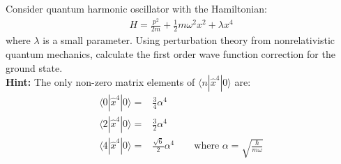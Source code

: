 \documentclass[11pt,a4paper]{article}
\begin{document}
Consider quantum harmonic oscillator with the Hamiltonian:
\begin{align*}
  H = \frac{p^2}{2m} + \frac{1}{2} m \omega^2 x^2 + \lambda x^4
\end{align*}
where $\lambda$ is a small parameter. 
Using perturbation theory from nonrelativistic quantum mechanics, calculate the first order wave function correction 
for the ground state. \\

{\bf Hint:} The only non-zero matrix elements of $\langle n|\hat{x}^4|0\rangle$ are:
\begin{align*}
   \langle 0 | \hat{x}^4 | 0 \rangle =& \frac{3}{4} \alpha^{4} \\
   \langle 2 | \hat{x}^4 | 0 \rangle =& \frac{3}{2} \alpha^{4} \\
   \langle 4 | \hat{x}^4 | 0 \rangle =& \frac{\sqrt{6}}{2} \alpha^{4} \qquad \text{where } \alpha = \sqrt{\frac{\hbar}{m \omega}} 
\end{align*}
\end{document}
